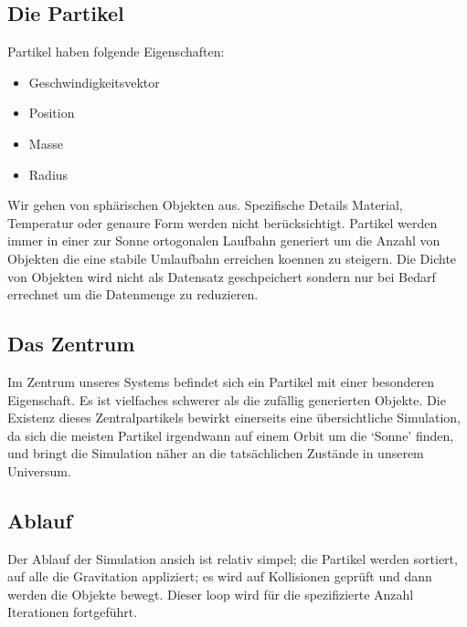 
\subsection{Die Partikel}
Partikel haben folgende Eigenschaften:
\begin{itemize}
    \item Geschwindigkeitsvektor
    \item Position
    \item Masse
    \item Radius
\end{itemize}
Wir gehen von sphärischen Objekten aus. Spezifische Details
Material, Temperatur oder genaure Form werden nicht berücksichtigt.
Partikel werden immer in einer zur Sonne ortogonalen Laufbahn generiert
um die Anzahl von Objekten die eine stabile Umlaufbahn erreichen koennen
zu steigern. Die Dichte von Objekten wird nicht als Datensatz geschpeichert
sondern nur bei Bedarf errechnet um die Datenmenge zu reduzieren.

\subsection{Das Zentrum}
Im Zentrum unseres Systems befindet sich ein Partikel mit einer besonderen
Eigenschaft. Es ist vielfaches schwerer als die zufällig generierten Objekte.
Die Existenz dieses Zentralpartikels bewirkt einerseits eine übersichtliche Simulation,
da sich die meisten Partikel irgendwann auf einem Orbit um die `Sonne' finden,
und bringt die Simulation näher an die tatsächlichen Zustände in unserem Universum.

\subsection{Ablauf}
Der Ablauf der Simulation ansich ist relativ simpel; die Partikel werden sortiert,
auf alle die Gravitation appliziert; es wird auf Kollisionen geprüft und dann werden
die Objekte bewegt. Dieser loop wird für die spezifizierte Anzahl Iterationen
fortgeführt.

